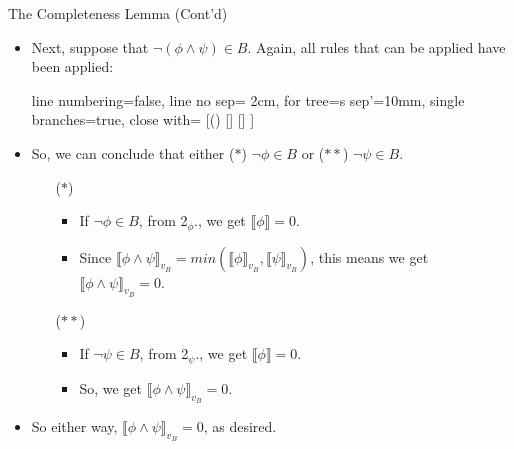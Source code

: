 \documentclass[../slides.tex]{subfiles}
\begin{document}
\begin{frame}{The Completeness Lemma (Cont'd)}

	\begin{itemize}
		
		\item Next, suppose that $\neg (\phi\land \psi)\in B$. Again, all rules that can be applied have been applied:
		\begin{center}
				\begin{prooftree}
					{
					line numbering=false,
					line no sep= 2cm,
					for tree={s sep'=10mm},
					single branches=true,
					close with=\xmark
					}
					[\neg(\phi\land\psi) [\neg\phi ] [\neg\psi ] ]
					\end{prooftree}
				\end{center}
		
		\item So, we can conclude that either ($\ast$) $\neg\phi\in B$ or ($\ast\ast$) $\neg\psi\in B$.
		
		\begin{enumerate}
		
			\item[($\ast$)] \begin{itemize}
		
		\item If $\neg\phi\in B$, from 2$_\phi$., we get $\llbracket \phi\rrbracket=0$. 
		
		\item Since $\llbracket\phi\land \psi\rrbracket_{v_B}=min(\llbracket\phi\rrbracket_{v_B},\llbracket\psi\rrbracket_{v_B})$, this means we get $\llbracket\phi\land \psi\rrbracket_{v_B}=0$.
		
				\end{itemize}
			\end{enumerate}
			
		\begin{enumerate}
		
			\item[($\ast\ast$)] \begin{itemize}
			\item If $\neg\psi\in B$, from 2$_\psi$., we get $\llbracket \phi\rrbracket=0$. 
		
		\item So, we get $\llbracket\phi\land \psi\rrbracket_{v_B}=0$.
		
		\end{itemize}
		
		\end{enumerate}
				
		\item So either way,  $\llbracket\phi\land \psi\rrbracket_{v_B}=0$, as desired.
	
	
	\end{itemize}

\end{frame}
\end{document}
